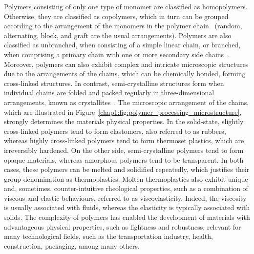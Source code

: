 Polymers consisting of only one type of monomer are classified as homopolymers.
Otherwise, they are classified as copolymers, which in turn can be grouped according to the arrangement of the monomers in the polymer chain~\cite{chap1:2002ebewele} (random, alternating, block, and graft are the usual arrangements).
Polymers are also classified as unbranched, when consisting of a simple linear chain, or branched, when comprising a primary chain with one or more secondary side chains~\cite{chap1:2002ebewele}.
Moreover, polymers can also exhibit complex and intricate microscopic structures due to the arrangements of the chains, which can be chemically bonded, forming cross-linked structures.
In contrast, semi-crystalline structures form when individual chains are folded and packed regularly in three-dimensional arrangements, known as crystallites~\cite{chap1:2002ebewele}.
The microscopic arrangement of the chains, which are illustrated in Figure~\ref{chap1:fig:polymer_processing_microstructure}, strongly determines the materials physical properties.
In the solid-state, slightly cross-linked polymers tend to form elastomers, also referred to as rubbers, whereas highly cross-linked polymers tend to form thermoset plastics, which are irreversibly hardened.
On the other side, semi-crystalline polymers tend to form opaque materials, whereas amorphous polymers tend to be transparent.
In both cases, these polymers can be melted and solidified repeatedly, which justifies their group denomination as thermoplastics.
Molten thermoplastics also exhibit unique and, sometimes, counter-intuitive rheological properties, such as a combination of viscous and elastic behaviours, referred to as viscoelasticity.
Indeed, the viscosity is usually associated with fluids, whereas the elasticity is typically associated with solids.
The complexity of polymers has enabled the development of materials with advantageous physical properties, such as lightness and robustness, relevant for many technological fields, such as the transportation industry, health, construction, packaging, among many others.

